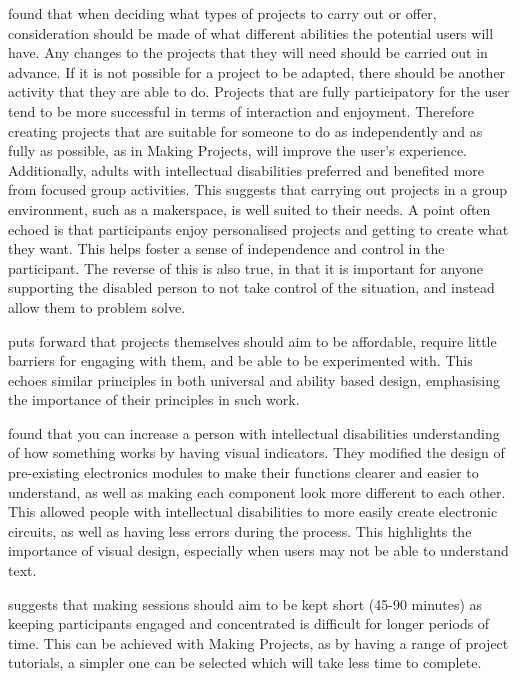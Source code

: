 \documentclass{l4proj}
\begin{document}
\cite{Bra2014} found that when deciding what types of projects to carry out or offer, consideration should be made of what different abilities the potential users will have. Any changes to the projects that they will need should be carried out in advance. If it is not possible for a project to be adapted, there should be another activity that they are able to do.
Projects that are fully participatory for the user tend to be more successful in terms of interaction and enjoyment. Therefore creating projects that are suitable for someone to do as independently and as fully as possible, as in Making Projects, will improve the user's experience.
Additionally, adults with intellectual disabilities preferred and benefited more from focused group activities. This suggests that carrying out projects in a group environment, such as a makerspace, is well suited to their needs. 
A point often echoed is that participants enjoy personalised projects and getting to create what they want. \cite{Boc2022} This helps foster a sense of independence and control in the participant. The reverse of this is also true, in that it is important for anyone supporting the disabled person to not take control of the situation, and instead allow them to problem solve. 

\cite{Ell2021} puts forward that projects themselves should aim to be affordable, require little barriers for engaging with them, and be able to be experimented with. This echoes similar principles in both universal and ability based design, emphasising the importance of their principles in such work. 

\cite{Hol2014a} found that you can increase a person with intellectual disabilities understanding of how something works by having visual indicators. They modified the design of pre-existing electronics modules to make their functions clearer and easier to understand, as well as making each component look more different to each other. This allowed people with intellectual disabilities to more easily create electronic circuits, as well as having less errors during the process. This highlights the importance of visual design, especially when users may not be able to understand text. 

\cite{Sen2022} suggests that making sessions should aim to be kept short (45-90 minutes) as keeping participants engaged and concentrated is difficult for longer periods of time. This can be achieved with Making Projects, as by having a range of project tutorials, a simpler one can be selected which will take less time to complete. 
\end{document}

